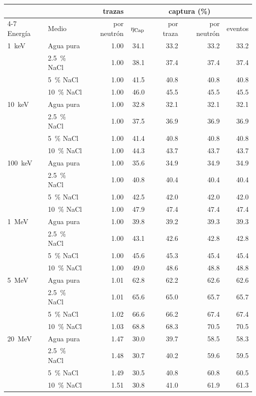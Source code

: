 \begin{tabular}{ll r rrrr}
\toprule
 & & trazas & \multicolumn{4}{c}{captura (\%)} \\
\cmidrule(lr){4-7}
Energía & Medio & por neutrón & $\eta_{\rm Cap}$ & por traza & por neutrón & eventos \\
\midrule
1~keV & Agua pura & 1.00 & 34.1 & 33.2 & 33.2 & 33.2 \\
 & 2.5~\% NaCl & 1.00 & 38.1 & 37.4 & 37.4 & 37.4 \\
 & 5~\% NaCl & 1.00 & 41.5 & 40.8 & 40.8 & 40.8 \\
 & 10~\% NaCl & 1.00 & 46.0 & 45.5 & 45.5 & 45.5 \\
\midrule
10~keV & Agua pura & 1.00 & 32.8 & 32.1 & 32.1 & 32.1 \\
 & 2.5~\% NaCl & 1.00 & 37.5 & 36.9 & 36.9 & 36.9 \\
 & 5~\% NaCl & 1.00 & 41.4 & 40.8 & 40.8 & 40.8 \\
 & 10~\% NaCl & 1.00 & 44.3 & 43.7 & 43.7 & 43.7 \\
\midrule
100~keV & Agua pura & 1.00 & 35.6 & 34.9 & 34.9 & 34.9 \\
 & 2.5~\% NaCl & 1.00 & 40.8 & 40.4 & 40.4 & 40.4 \\
 & 5~\% NaCl & 1.00 & 42.5 & 42.0 & 42.0 & 42.0 \\
 & 10~\% NaCl & 1.00 & 47.9 & 47.4 & 47.4 & 47.4 \\
\midrule
1~MeV & Agua pura & 1.00 & 39.8 & 39.2 & 39.3 & 39.3 \\
 & 2.5~\% NaCl & 1.00 & 43.1 & 42.6 & 42.8 & 42.8 \\
 & 5~\% NaCl & 1.00 & 45.6 & 45.3 & 45.4 & 45.4 \\
 & 10~\% NaCl & 1.00 & 49.0 & 48.6 & 48.8 & 48.8 \\
\midrule
5~MeV & Agua pura & 1.01 & 62.8 & 62.2 & 62.6 & 62.6 \\
 & 2.5~\% NaCl & 1.01 & 65.6 & 65.0 & 65.7 & 65.7 \\
 & 5~\% NaCl & 1.02 & 66.6 & 66.2 & 67.4 & 67.4 \\
 & 10~\% NaCl & 1.03 & 68.8 & 68.3 & 70.5 & 70.5 \\
\midrule
20~MeV & Agua pura & 1.47 & 30.0 & 39.7 & 58.5 & 58.3 \\
 & 2.5~\% NaCl & 1.48 & 30.7 & 40.2 & 59.6 & 59.5 \\
 & 5~\% NaCl & 1.49 & 30.5 & 40.8 & 60.8 & 60.5 \\
 & 10~\% NaCl & 1.51 & 30.8 & 41.0 & 61.9 & 61.3 \\

\end{tabular}
